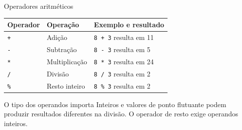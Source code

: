 \begin{frame}{Operadores aritméticos}
\begin{center}
\begin{tabular}{lll}
\toprule
Operador & Operação & Exemplo e resultado \\
\midrule
\texttt{+} & Adição & \texttt{8 + 3} resulta em 11 \\
\texttt{-} & Subtração & \texttt{8 - 3} resulta em 5 \\
\texttt{*} & Multiplicação & \texttt{8 * 3} resulta em 24 \\
\texttt{/} & Divisão & \texttt{8 / 3} resulta em 2 \\
\texttt{\%} & Resto inteiro & \texttt{8 \% 3} resulta em 2 \\
\bottomrule
\end{tabular}
\end{center}
\begin{alertblock}{O tipo dos operandos importa}
Inteiros e valores de ponto flutuante podem produzir resultados diferentes na divisão. O operador de resto exige operandos inteiros.
\end{alertblock}
\end{frame}
